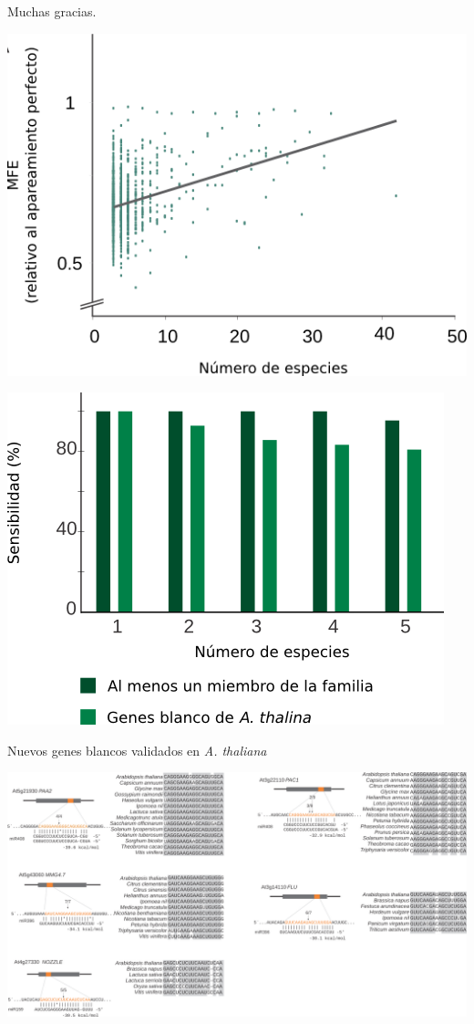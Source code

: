 \documentclass{beamer}
\begin{document}
\begin{frame}{}
	\begin{center}
		\Huge Muchas gracias.
	\end{center}
\end{frame}

\begin{frame}{}
	\begin{center}
	\end{center}
\end{frame}

\begin{frame}{}
	\begin{center}
		\includegraphics[width=.5\textwidth]{img/extras/NAR_fig3A.png}
	\end{center}
\end{frame}

\begin{frame}{}
	\begin{center}
		\includegraphics[width=.5\textwidth]{img/extras/NAR_fig3B.png}
	\end{center}
\end{frame}

\begin{frame}{Nuevos genes blancos validados en \textit{A. thaliana}}
	\begin{center}
		\includegraphics[width=1\textwidth]{img/Figure4_retocada.png}
	\end{center}
\end{frame}
\end{document}

